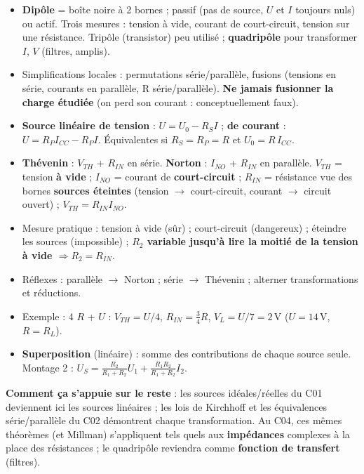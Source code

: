 \begin{recapbox}[title={Récap pour l'examen --- C03 : Méthodes d'analyse}]
\begin{itemize}
  \item \textbf{Dipôle} = boîte noire à 2 bornes ; passif (pas de source, $U$ et $I$ toujours
        nuls) ou actif. Trois mesures : tension à vide, courant de court-circuit, tension sur
        une résistance. Tripôle (transistor) peu utilisé ; \textbf{quadripôle} pour
        transformer $I$, $V$ (filtres, amplis).
  \item Simplifications locales : permutations série/parallèle, fusions (tensions en série,
        courants en parallèle, R série/parallèle). \textbf{Ne jamais fusionner la charge
        étudiée} (on perd son courant : conceptuellement faux).
  \item \textbf{Source linéaire de tension} : $U = U_0 - R_S I$ ; \textbf{de courant} :
        $U = R_P I_{CC} - R_P I$. Équivalentes si $R_S = R_P = R$ et
        $\boxed{U_0 = R\,I_{CC}}$.
  \item \textbf{Thévenin} : $V_{TH}$ + $R_{IN}$ en série. \textbf{Norton} : $I_{NO}$ +
        $R_{IN}$ en parallèle. $V_{TH}$ = tension \textbf{à vide} ; $I_{NO}$ = courant de
        \textbf{court-circuit} ; $R_{IN}$ = résistance vue des bornes \textbf{sources
        éteintes} (tension $\to$ court-circuit, courant $\to$ circuit ouvert) ;
        $V_{TH} = R_{IN} I_{NO}$.
  \item Mesure pratique : tension à vide (sûr) ; court-circuit (dangereux) ; éteindre les
        sources (impossible) ; \textbf{$R_2$ variable jusqu'à lire la moitié de la tension à
        vide $\Rightarrow R_2 = R_{IN}$}.
  \item Réflexes : parallèle $\to$ Norton ; série $\to$ Thévenin ; alterner transformations
        et réductions.
  \item Exemple : 4 $R$ + $U$ : $V_{TH} = U/4$, $R_{IN} = \frac34 R$, $V_L = U/7 = 2$\,V
        ($U = 14$\,V, $R = R_L$).
  \item \textbf{Superposition} (linéaire) : somme des contributions de chaque source seule.
        Montage 2 : $U_S = \frac{R_2}{R_1+R_2}U_1 + \frac{R_1R_2}{R_1+R_2}I_2$.
\end{itemize}
\textbf{Comment ça s'appuie sur le reste} : les sources idéales/réelles du C01 deviennent ici
les \og sources linéaires\fg{} ; les lois de Kirchhoff et les équivalences série/parallèle du
C02 démontrent chaque transformation. Au C04, ces mêmes théorèmes (et Millman) s'appliquent
tels quels aux \textbf{impédances} complexes à la place des résistances ; le quadripôle
reviendra comme \textbf{fonction de transfert} (filtres).
\end{recapbox}
